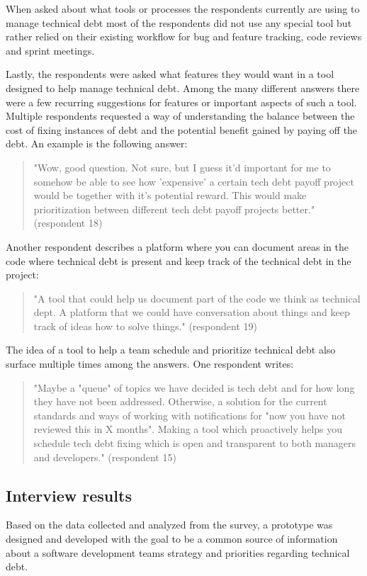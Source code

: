 When asked about what tools or processes the respondents currently are using to manage technical debt most of the respondents did not use any special tool but rather relied on their existing workflow for bug and feature tracking, code reviews and sprint meetings.

Lastly, the respondents were asked what features they would want in a tool designed to help manage technical debt.
Among the many different answers there were a few recurring suggestions for features or important aspects of such a tool.
Multiple respondents requested a way of understanding the balance between the cost of fixing instances of debt and the potential benefit gained by paying off the debt. An example is the following answer:
\begin{quote}
  "Wow, good question. Not sure, but I guess it'd important for me to somehow be able to see how 'expensive' a certain tech debt payoff project would be together with it's potential reward. This would make prioritization between different tech debt payoff projects better." (respondent 18)
\end{quote}
Another respondent describes a platform where you can document areas in the code where technical debt is present and keep track of the technical debt in the project:
\begin{quote}
  "A tool that could help us document part of the code we think as technical dept. A platform that we could have conversation about things and keep track of ideas how to solve things." (respondent 19)
\end{quote}
The idea of a tool to help a team schedule and prioritize technical debt also surface multiple times among the answers. One respondent writes:
\begin{quote}
  "Maybe a "queue" of topics we have decided is tech debt and for how long they have not been addressed. Otherwise, a solution for the current standards and ways of working with notifications for "now you have not reviewed this in X months". Making a tool which proactively helps you schedule tech debt fixing which is open and transparent to both managers and developers." (respondent 15)
\end{quote} 

\subsection{Interview results}
Based on the data collected and analyzed from the survey, a prototype was designed and developed with the goal to be a common source of information about a software development teams strategy and priorities regarding technical debt.